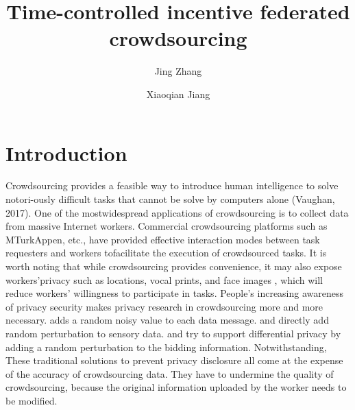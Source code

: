\documentclass[final,1p,times]{elsarticle}
\begin{document}
	
\begin{frontmatter}
		
\title{Time-controlled incentive federated crowdsourcing}
		

\author[mymainaddress]{Jing Zhang 
}
		
\author[secondaddress]{Xiaoqian Jiang}
		
		
\address[mymainaddress]{School of Cyber Science and Engineering, Southeast University, No. 2 SEU Road, Nanjing 211189, China}
\address[secondaddress]{School of Cyber Science and Engineering, Southeast University, No. 2 SEU Road, Nanjing 211189, China}
		
\begin{abstract}
			
\end{abstract}
\begin{keyword}
	
\end{keyword}
\end{frontmatter}

\section{Introduction} 
Crowdsourcing provides a feasible way to introduce human intelligence to solve notori-ously difficult tasks that cannot be solve by computers alone (Vaughan, 2017). One of the mostwidespread applications of crowdsourcing is to collect data from massive Internet workers. Commercial crowdsourcing platforms such as MTurkAppen, etc., have provided effective interaction modes between task requesters and workers tofacilitate the execution of crowdsourced tasks. 
It is worth noting that while crowdsourcing provides convenience, it may also expose workers'privacy such as locations, vocal prints, and face images \citep{xia2020privacy}, which will reduce workers' willingness to participate in tasks.
 People's increasing awareness of privacy security makes privacy research in crowdsourcing more and more necessary. \cite{chen2017private} adds a random noisy value to each data message. \cite{varshney2014assuring} and \cite{jin2016inception} directly add random perturbation to sensory data. \cite{jin2016enabling} and \cite{luo2016incentive} try to support differential privacy by adding a random perturbation to the bidding information. 
Notwithstanding, These traditional solutions to prevent privacy disclosure all come at the expense of the accuracy of crowdsourcing data. They have to undermine the quality of crowdsourcing, because the original information uploaded by the worker needs to be modified.
\end{document}
